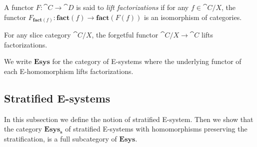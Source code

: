 \begin{defn}
A functor $F:\cat{C}\to\cat{D}$ is said to
\emph{lift factorizations} if for any $f\in\cat{C}/X$, the functor
$F_{\mathbf{fact}(f)}:\mathbf{fact}(f)\to\mathbf{fact}(F(f))$ is an isomorphism
of categories. 
\end{defn}

\begin{comment}
\begin{rmk}
We may choose the property of lifting factorizations
to involve either an equivalence or an isomorphism of categories. The
isomorphism-version, would say that for every factorization $h'\circ g'$
of $F(f)$ there is a unique factorization $f\jdeq h\circ g$ in $\cat{C}$ such
that $F(g)\jdeq g'$ and $F(h)\jdeq h'$. In the version with equivalences,
the uniqueness is replaced by uniqueness up to isomorphism, and the equalites
are replaced by an isomorphism in $\mathbf{fact}(F(f))$. 

It is easier to state the isomorphism version of lifting factorizations with
inference rules and it might be easier to explain this condition on type theoretical
grounds, although the equivalence version has the advantage of being
categorical (i.e.~invariant under equivalence of categories).

In the present
context, it doesn't matter very much which one we pick: the categories in which
we're interested are all posets.
\end{rmk}
\end{comment}

\begin{eg}
For any slice category $\cat{C}/X$, the forgetful functor $\cat{C}/X\to\cat{C}$
lifts factorizations.
\end{eg}

\begin{defn}
We write $\mathbf{Esys}$ for the category of E-systems where the underlying
functor of each E-homomorphism lifts factorizations.
\end{defn}

\subsection{Stratified E-systems}

In this subsection we define the notion of stratified E-system. Then we show
that the category $\mathbf{Esys_s}$ of stratified E-systems with homomorphisms preserving the
stratification, is a full subcategory of $\mathbf{Esys}$. 

